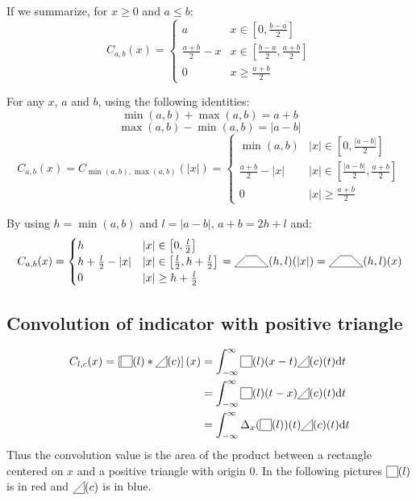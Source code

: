 \documentclass[a4paper,10pt]{article}
\newcommand\Shifted[2]{\Delta_{#1}(#2)}
\newcommand\SymSquare{\begin{tikzpicture}[baseline=0.5ex]%
        \draw (0,0) -- (0,1em) -- (1em,1em) -- (1em,0) -- cycle;
\end{tikzpicture}}
\newcommand\OldIndicator[1]{\SymSquare(#1)}
\newcommand\SymPositiveTriangle{\begin{tikzpicture}[baseline=0.5ex]%
        \draw (0,0) -- (1em,0em) -- (1em,1em) -- cycle;
\end{tikzpicture}}
\newcommand\PositiveTriangle[1]{\SymPositiveTriangle(#1)}
\newcommand\SymTrapezoid{\begin{tikzpicture}[baseline=0.5ex]%
        \draw (0,0) -- (3em,0) -- (2em,1em) -- (1em,1em) -- cycle;
\end{tikzpicture}}
\newcommand\Trapezoid[2]{\SymTrapezoid(#1,#2)}%
\newcommand\D{\mathrm{d}}
\newcommand\Convolution{\ast}
\newcommand\IntR[2]{\int_{-\infty}^{\infty}#1 \D#2}
\begin{document}
If we summarize, for $x \ge 0$ and $a \le b$:
\[ C_{a,b}(x) = \begin{cases}
    a & x \in \left[ 0, \frac{b-a}{2} \right] \\
    \frac{a+b}{2} - x & x \in \left[ \frac{b-a}{2}, \frac{a+b}{2} \right] \\
    0 & x \ge \frac{a+b}{2}
\end{cases} \]

For any $x$, $a$ and $b$, using the following identities:
\[ \min(a,b) + \max(a,b) = a + b \]
\[ \max(a,b) - \min(a,b) = |a - b| \]
\[ C_{a,b}(x) = C_{\min(a,b),\max(a,b)}(|x|) = \begin{cases}
    \min(a,b) & |x| \in \left[0, \frac{|a-b|}{2} \right] \\
    \frac{a+b}{2} - |x| & |x| \in \left[ \frac{|a-b|}{2}, \frac{a+b}{2} \right] \\
    0 & |x| \ge \frac{a+b}{2}
\end{cases} \]

By using $h = \min(a,b)$ and $l = |a-b|$, $a+b=2h+l$ and:
\[ C_{a,b}(x) = \begin{cases}
    h & |x| \in \left[0, \frac{l}{2} \right] \\
    h+\frac{l}{2} - |x| & |x| \in \left[ \frac{l}{2}, h+\frac{l}{2} \right] \\
    0 & |x| \ge h+\frac{l}{2}
\end{cases} = \Trapezoid{h}{l}(|x|) = \Trapezoid{h}{l}(x) \]

\subsection{Convolution of indicator with positive triangle}
\[ \begin{split}
    C_{l,c}(x) = \left[ \OldIndicator{l} \Convolution \PositiveTriangle{c} \right] (x) & = \IntR{\OldIndicator{l}(x-t) \PositiveTriangle{c}(t)}{t} \\
    & = \IntR{\OldIndicator{l}(t-x) \PositiveTriangle{c}(t)}{t} \\
    & = \IntR{\Shifted{x}{\OldIndicator{l}}(t) \PositiveTriangle{c}(t)}{t}
\end{split} \]
Thus the convolution value is the area of the product between a rectangle centered on $x$ and a positive triangle with origin $0$.
In the following pictures $\OldIndicator{l}$ is in red and $\PositiveTriangle{c}$ is in blue.
\end{document}
